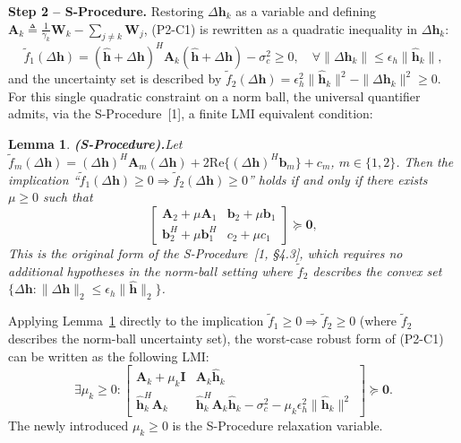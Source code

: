 \documentclass[12pt,a4paper]{article}
\newtheorem{lemma}{Lemma}
\newcommand{\vect}[1]{\mathbf{#1}}
\newcommand{\mat}[1]{\mathbf{#1}}
\newcommand{\Real}{\text{Re}}
\begin{document}
\textbf{Step 2 -- S-Procedure.} Restoring $\Delta\vect{h}_k$ as a variable and defining $\mat{A}_k \triangleq \frac{1}{\gamma_k} \mat{W}_k - \sum_{j \neq k} \mat{W}_j$, (P2-C1) is rewritten as a quadratic inequality in $\Delta\vect{h}_k$:
\[
\tilde{f}_1(\Delta\vect{h}) = (\hat{\vect{h}} + \Delta\vect{h})^H \mat{A}_k (\hat{\vect{h}} + \Delta\vect{h}) - \sigma_c^2 \geq 0, \quad \forall \|\Delta\vect{h}_k\| \leq \epsilon_h \|\hat{\vect{h}}_k\|,
\]
and the uncertainty set is described by $\tilde{f}_2(\Delta\vect{h}) = \epsilon_h^2 \|\hat{\vect{h}}_k\|^2 - \|\Delta\vect{h}_k\|^2 \geq 0$. For this single quadratic constraint on a norm ball, the universal quantifier admits, via the S-Procedure~[1], a finite LMI equivalent condition:

\begin{lemma}\textbf{(S-Procedure).}\label{lem:s-procedure}
Let $\tilde{f}_m(\Delta\vect{h}) = (\Delta\vect{h})^H \mat{A}_m (\Delta\vect{h}) + 2\Real\{(\Delta\vect{h})^H \vect{b}_m\} + c_m$, $m \in \{1, 2\}$. Then the implication ``$\tilde{f}_1(\Delta\vect{h}) \geq 0 \Rightarrow \tilde{f}_2(\Delta\vect{h}) \geq 0$'' holds \emph{if and only if} there exists $\mu \geq 0$ such that
\[
\begin{bmatrix} \mat{A}_2 + \mu \mat{A}_1 & \vect{b}_2 + \mu \vect{b}_1 \\ \vect{b}_2^H + \mu \vect{b}_1^H & c_2 + \mu c_1 \end{bmatrix} \succeq \mat{0},
\]
This is the original form of the S-Procedure~[1, \S4.3], which requires no additional hypotheses in the norm-ball setting where $\tilde{f}_2$ describes the convex set $\{ \Delta\vect{h} : \|\Delta\vect{h}\|_2 \leq \epsilon_h \|\hat{\vect{h}}\|_2 \}$.
\end{lemma}

Applying Lemma~\ref{lem:s-procedure} directly to the implication $\tilde{f}_1 \geq 0 \Rightarrow \tilde{f}_2 \geq 0$ (where $\tilde{f}_2$ describes the norm-ball uncertainty set), the worst-case robust form of (P2-C1) can be written as the following LMI:
\begin{equation}
\exists \mu_k \geq 0: \begin{bmatrix} \mat{A}_k + \mu_k \mat{I} & \mat{A}_k \hat{\vect{h}}_k \\[1.2ex] \hat{\vect{h}}_k^H \mat{A}_k & \hat{\vect{h}}_k^H \mat{A}_k \hat{\vect{h}}_k - \sigma_c^2 - \mu_k \epsilon_h^2 \|\hat{\vect{h}}_k\|^2 \end{bmatrix} \succeq \mat{0}. \tag{S3.1}
\end{equation}
The newly introduced $\mu_k \geq 0$ is the S-Procedure relaxation variable.
\end{document}
